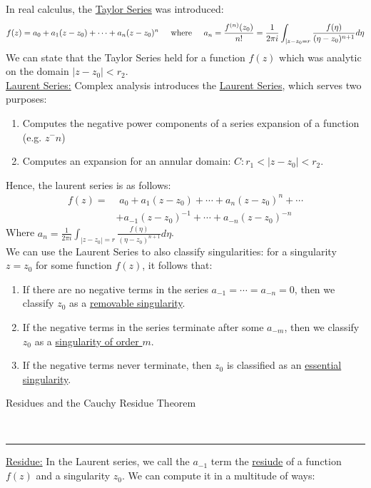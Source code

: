 \documentclass{article}
\newcommand{\header}[1]{\begin{large}\noindent #1\end{large}\\\rule{\textwidth}{0.5pt}}
\newcommand{\gap}{\medskip\\}
\newcommand{\where}{\hspace{0.5cm} \textrm{where} \hspace{0.5cm}}
\newcommand{\sheader}[1]{\underline{#1:}}
\begin{document}
    In real calculus, the \underline{Taylor Series} was introduced:
    \begin{align*}
        f(z) = a_0 + a_1(z - z_0) + \cdots + a_n(z-z_0)^n \where a_n = \frac{f^{(n)}(z_0)}{n!} =
        \frac{1}{2\pi i}\int_{|z-z_0 = r}\frac{f(\eta)}{(\eta - z_0)^{n + 1}}d\eta
    \end{align*}
    We can state that the Taylor Series held for a function $f(z)$ which was 
    analytic on the domain $|z-z_0| < r_2$.
    \gap
    \sheader{Laurent Series} Complex analysis introduces the \underline{Laurent Series}, which
    serves two purposes:
    \begin{enumerate}
        \item Computes the negative power components of a series expansion of a function (e.g. $z^-n$)
        \item Computes an expansion for an annular domain: $C: r_1 < |z-z_0| < r_2$.
    \end{enumerate}
    Hence, the laurent series is as follows:
    \begin{align*}
        f(z) =&\,\, a_0 + a_1(z-z_0) + \cdots + a_n(z - z_0)^n + \cdots \\
        & + a_{-1}(z - z_0)^{-1} + \cdots + a_{-n}(z - z_0)^{-n}
    \end{align*}
    Where $\displaystyle a_n = \frac{1}{2\pi i} \int_{|z-z_0| = r} \frac{f(\eta)}{(\eta - z_0)^{n + 1}}d\eta$.
    \gap
    We can use the Laurent Series to also classify singularities: for a singularity $z = z_0$
    for some function $f(z)$, it follows that:
    \begin{enumerate}
        \item If there are no negative terms in the series $a_{-1} = \cdots = a_{-n} = 0$,
        then we classify $z_0$ as a \underline{removable singularity}.
        \item If the negative terms in the series terminate after some $a_{-m}$, then 
        we classify $z_0$ as a \underline{singularity of order $m$}.
        \item If the negative terms never terminate, then $z_0$ is classified as an \underline{essential singularity}.
    \end{enumerate}

    \pagebreak

    \header{Residues and the Cauchy Residue Theorem}

    \sheader{Residue} In the Laurent series, we call the $a_{-1}$ term the \underline{resiude}
    of a function $f(z)$ and a singularity $z_0$. We can compute it in a multitude of ways:
\end{document}
